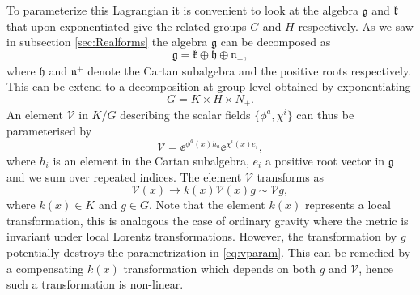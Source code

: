 To parameterize this Lagrangian it is convenient to look at the algebra $\mathfrak{g}$ and $\mathfrak{k}$ that upon exponentiated give the related groups $G$ and $H$ respectively. As we saw in subsection \ref{sec:Realforms} the algebra $\mathfrak{g}$ can be decomposed as 
\begin{equation}
    \mathfrak{g} = \mathfrak{k}\oplus \mathfrak{h}\oplus\mathfrak{n}_+,
\end{equation}
where $\mathfrak{h}$ and $\mathfrak{n}^+$ denote the Cartan subalgebra and the positive roots respectively. This can be extend to a decomposition at group level obtained by exponentiating 
\begin{equation}
    G = K\times H\times N_+.
\end{equation}
An element $\mathcal{V}$ in $K/G$ describing the scalar fields $\{\phi^a,\chi^i\}$ can thus be parameterised by 
\begin{equation}\label{eq:vparam}
    \mathcal{V} = \ee^{\phi^a(x)h_a}\ee^{\chi^i(x)e_i},
\end{equation}
where $h_i$ is an element in the Cartan subalgebra, $e_i$ a positive root vector in $\mathfrak{g}$ and we sum over repeated indices. The element $\mathcal{V}$ transforms as 
\begin{equation}
    \mathcal{V}(x) \to k(x)\mathcal{V}(x)g\sim \mathcal{V}g,
\end{equation}
where $k(x)\in K$ and $g\in G$. Note that the element $k(x)$ represents a local transformation, this is analogous the case of ordinary gravity where the metric is invariant under local Lorentz transformations. However, the transformation by $g$ potentially destroys the parametrization in \eqref{eq:vparam}. This can be remedied by a compensating $k(x)$ transformation which depends on both $g$ and $\mathcal{V}$, hence such a transformation is non-linear. 




